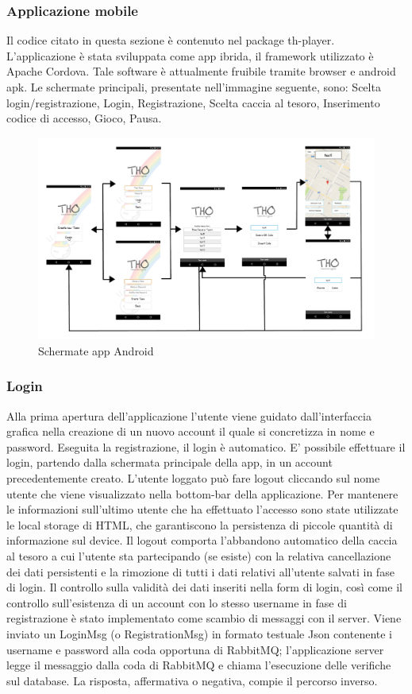 \documentclass[12pt, italian]{article}
\begin{document}
\subsubsection{Applicazione mobile}
Il codice citato in questa sezione è contenuto nel package th-player.
L'applicazione è stata sviluppata come app ibrida, il framework utilizzato è Apache Cordova.
Tale software è attualmente fruibile tramite browser e android apk.
Le schermate principali, presentate nell'immagine seguente, sono: Scelta login/registrazione, Login, Registrazione, Scelta caccia al tesoro, Inserimento codice di accesso, Gioco, Pausa.

\begin{figure}[H]
	\centering
	\includegraphics[width=1\textwidth]{img/flusso01.png}
	\caption{Schermate app Android}
\end{figure}

\subsubsection*{Login}
Alla prima apertura dell'applicazione l'utente viene guidato dall'interfaccia grafica nella creazione di un nuovo account il quale si concretizza in nome e password. Eseguita la registrazione, il login è automatico.
E' possibile effettuare il login, partendo dalla schermata principale della app, in un account precedentemente creato.
L'utente loggato può fare logout cliccando sul nome utente che viene visualizzato nella bottom-bar della applicazione.
Per mantenere le informazioni sull'ultimo utente che ha effettuato l'accesso sono state utilizzate le local storage di HTML, che garantiscono la persistenza di piccole quantità di informazione sul device. Il logout comporta l'abbandono automatico della caccia al tesoro a cui l'utente sta partecipando (se esiste) con la relativa cancellazione dei dati persistenti e la rimozione di tutti i dati relativi all'utente salvati in fase di login.
Il controllo sulla validità dei dati inseriti nella form di login, così come il controllo sull'esistenza di un account con lo stesso username in fase di registrazione è stato implementato come scambio di messaggi con il server.
Viene inviato un LoginMsg (o RegistrationMsg) in formato testuale Json contenente i username e password alla coda opportuna di RabbitMQ; l'applicazione server legge il messaggio dalla coda di RabbitMQ e chiama l'esecuzione delle verifiche sul database. La risposta, affermativa o negativa, compie il percorso inverso.
\end{document}

